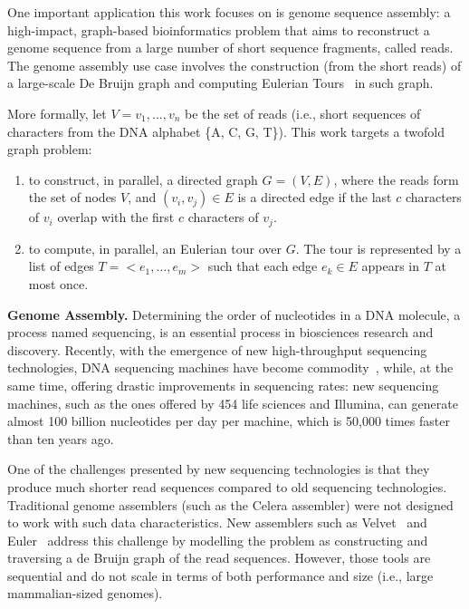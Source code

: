 \documentclass{acm_proc_article-sp}[12pt]
\begin{document}
One important application this work focuses on is genome sequence assembly: a high-impact, graph-based bioinformatics problem that aims to reconstruct a genome sequence from a large number of short sequence fragments, called reads. The genome assembly use case involves the construction (from the short reads) of a large-scale De Bruijn graph and computing Eulerian Tours~\cite{pevzner2001eulerian, zerbino2008velvet} in such graph.

More formally, let $V={v_1,...,v_n}$ be the set of reads (i.e., short sequences of characters from the DNA alphabet \{A, C, G, T\}). This work targets a twofold graph problem:

\begin{enumerate}
 \item to construct, in parallel, a directed graph $G=(V,E)$, where the reads form the set of nodes $V$, and $(v_i,v_j) \in E$ is a directed edge if the last $c$ characters of $v_i$ overlap with the first $c$ characters of $v_j$.

 \item to compute, in parallel, an Eulerian tour over $G$. The tour is represented by a list of edges $T=<e_1,...,e_m>$ such that each edge $e_k \in E$ appears in $T$ at most once. 
\end{enumerate}

{\bf Genome Assembly.} Determining the order of nucleotides in a DNA molecule, a process named sequencing, is an essential process in biosciences research and discovery. Recently, with the emergence of new high-throughput sequencing technologies, DNA sequencing machines have become commodity~\cite{venter2010multiple}, while, at the same time, offering drastic improvements in sequencing rates: new sequencing machines, such as the ones offered by 454 life sciences and Illumina, can generate almost 100 billion nucleotides per day per machine, which is 50,000 times faster than ten years ago. 

One of the challenges presented by new sequencing technologies is that they produce much shorter read sequences compared to old sequencing technologies. Traditional genome assemblers (such as the Celera assembler) were not designed to work with such data characteristics. New assemblers such as Velvet~\cite{Zerbino2008} and Euler~\cite{pevzner2001eulerian} address this challenge by modelling the problem as constructing and traversing a de Bruijn graph of the read sequences. However, those tools are sequential and do not scale in terms of both performance and size (i.e., large mammalian-sized genomes).
\end{document}
